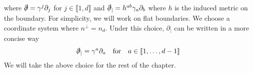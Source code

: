 where $\slashed{\partial} = \gamma^j\partial_j$ for
$j \in \llbracket 1 , d \rrbracket$ and $\slashed{\partial}_| = h^{ab} \gamma_{a} \partial_{b}$ where $h$ is the induced metric on the boundary.
For simplicity, we will work on flat boundaries.
We choose a coordinate system where $n^\perp = n_d$.
Under this choice,
$\partial_|$ can be written in a more concise way
\begin{equation*}
\slashed \partial_| = \gamma^a\partial_a \quad\mathrm{for}\quad 
a \in \llbracket 1, \ldots, d-1 \rrbracket
\end{equation*}
We will take the above choice for the rest of the chapter. 





